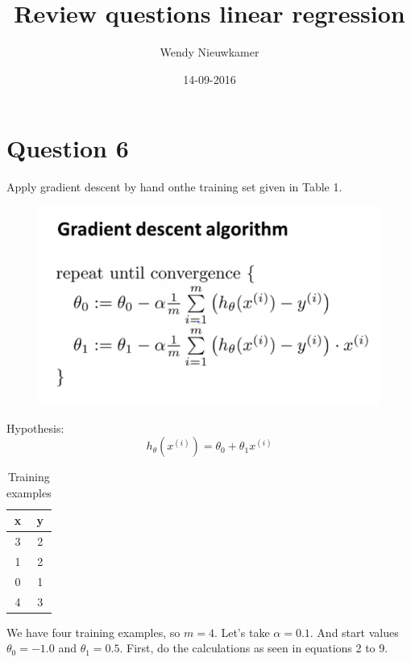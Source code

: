 \documentclass{article}
\title{Review questions linear regression}
\date{14-09-2016}
\author{Wendy Nieuwkamer}
\begin{document}
\maketitle

\section{Question 6}
Apply gradient descent by hand onthe training set given in Table 1.

\begin{figure}[h!]
    \center
    \includegraphics[scale=0.4]{Gradient_descent_algorithm}
    \label{GDA}
\end{figure}


Hypothesis:
\begin{equation}
h_{\theta}(x^{(i)}) = \theta _0 + \theta _1 x^{(i)}
\end{equation}

\begin{table}[h!]
  \centering
  \caption{Training examples}
  \label{tab:table1}
  \begin{tabular}{cc}
    \toprule
    x & y \\
    \midrule
    3&2\\
    1&2\\
    0&1\\
    4&3\\
    \bottomrule
  \end{tabular}
\end{table}

We have four training examples, so $m=4$. Let's take $\alpha = 0.1$. And start values $\theta _0 = -1.0$  and $\theta _1 = 0.5$. First, do the calculations as seen in equations 2 to 9.
\end{document}
